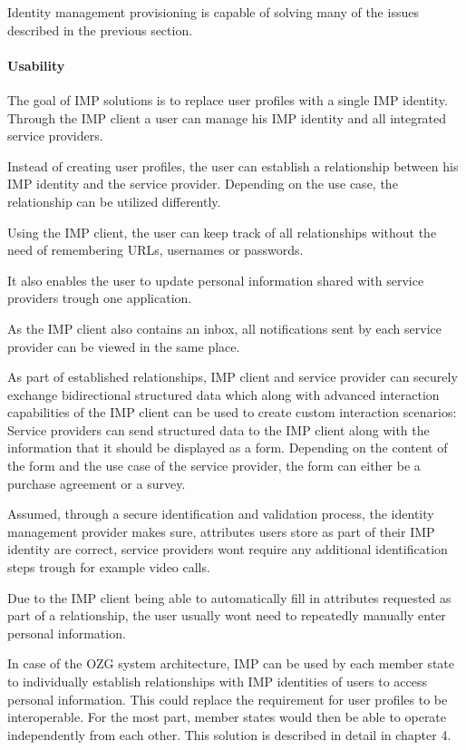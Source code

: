 Identity management provisioning is capable of solving many of the issues described in the previous section.

\paragraph{Usability}

The goal of IMP solutions is to replace user profiles with a single IMP identity. Through the IMP client a user can manage his IMP identity and all integrated service providers.

Instead of creating user profiles, the user can establish a relationship between his IMP identity and the service provider. Depending on the use case, the relationship can be utilized differently.

Using the IMP client, the user can keep track of all relationships without the need of remembering URLs, usernames or passwords.

It also enables the user to update personal information shared with service providers trough one application.

As the IMP client also contains an inbox, all notifications sent by each service provider can be viewed in the same place.

As part of established relationships, IMP client and service provider can securely exchange bidirectional structured data which along with advanced interaction capabilities of the IMP client can be used to create custom interaction scenarios: Service providers can send structured data to the IMP client along with the information that it should be displayed as a form. Depending on the content of the form and the use case of the service provider, the form can either be a purchase agreement or a survey. 

Assumed, through a secure identification and validation process, the identity management provider makes sure, attributes users store as part of their IMP identity are correct, service providers wont require any additional identification steps trough for example video calls.

Due to the IMP client being able to automatically fill in attributes requested as part of a relationship, the user usually wont need to repeatedly manually enter personal information.

In case of the OZG system architecture, IMP can be used by each member state to individually establish relationships with IMP identities of users to access personal information. This could replace the requirement for user profiles to be interoperable. For the most part, member states would then be able to operate independently from each other. This solution is described in detail in chapter 4.

